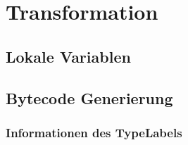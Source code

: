 \chapter{Transformation}
\label{ch:trans}

\section{Lokale Variablen}
\label{sec:locals}

\section{Bytecode Generierung}

\subsection{Informationen des TypeLabels}
\label{ssec:infoLabel}
